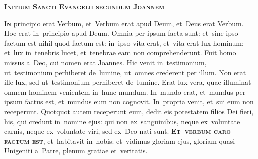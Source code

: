 \documentclass[first]{../altarcard}
\begin{document}
\begin{center}

	\fontsize{13.5}{16.2}\selectfont 

	\begin{minipage}{0.55\linewidth}

		\topgap\topgap\topgap

		\begin{center} 
			\scshape\bfseries\Huge
			Initium Sancti Evangelii secundum Joannem
		\end{center}

		\gapp\gapp\gapp

		\lettrine[lines=3]{\color{newred}I}{\bfseries\color{newred}n}
		principio erat Verbum, et~Verbum erat apud Deum, et~Deus erat
		Verbum. Hoc erat in~principio apud Deum. Omnia per ipsum facta
		sunt: et~sine ipso factum est nihil quod factum est: in~ipso
		vita erat, et~vita erat lux hominum: et~lux in~tenebris lucet,
		et~tenebrae eam non comprehenderunt. Fuit homo missus a~Deo,
		cui nomen erat Joannes. Hic venit in~testimonium,
		ut~testimonium perhiberet de~lumine, ut~omnes crederent per
		illum. Non erat ille lux, sed ut~testimonium perhiberet
		de~lumine. Erat lux vera, quae illuminat omnem hominem
		venientem in~hunc mundum. In~mundo erat, et~mundus per ipsum
		factus est, et~mundus eum non cognovit. In~propria venit,
		et~sui eum non receperunt. Quotquot autem receperunt eum, dedit
		eis potestatem filios Dei fieri, his, qui credunt in~nomine
		ejus: qui non ex~sanguinibus, neque ex~voluntate carnis, neque
		ex~voluntate viri, sed ex~Deo nati sunt.
		\textcolor{newred}{\textbf{\textsc{Et~verbum caro factum
		est}}},
		et~habitavit in~nobis: et~vidimus gloriam ejus, gloriam quasi
		Unigeniti a~Patre, plenum gratiae et~veritatis.

	\end{minipage}
\end{center}

\vspace*{1cm}
\end{document}
